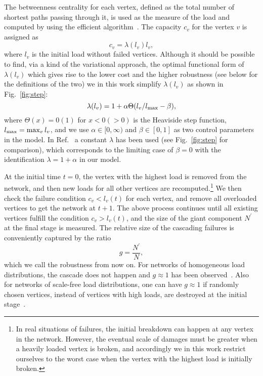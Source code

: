 \documentclass[doublecol]{epl2}
\begin{document}
The betweenness centrality for each vertex, defined as the total
number of shortest paths passing through it, is used as the measure
of the load and computed by using the efficient
algorithm~\cite{Newman}. The capacity $c_v$ for the vertex $v$ is
assigned as
\begin{equation}
\label{eq:c} c_v=\lambda(l_v) l_v ,
\end{equation}
where $l_v$ is the initial load without failed vertices. Although it
should be possible to find, via a kind of the variational approach,
the optimal functional form of $\lambda(l_v)$ which gives rise to
the lower cost and the higher robustness (see below for the
definitions of the two) we in this work simplify $\lambda(l_v)$ as
shown in Fig.~\ref{fig:step}:
\begin{equation}
\label{eq:step} \lambda(l_v) = 1 + \alpha\Theta(l_v/l_{\rm max} -
\beta),
\end{equation}
where $\Theta(x) = 0 (1)$ for $x < 0 (> 0)$ is the Heaviside step
function, $l_{\rm max} = \max_v l_v$, and we use
$\alpha\in{[0,\infty)}$ and $\beta \in [0,1]$ as two control
parameters in the model. In Ref.~\cite{CasModel} a constant
$\lambda$  has been used (see Fig.~\ref{fig:step} for comparison),
which corresponds to the limiting case of $\beta = 0$ with the
identification $\lambda = 1 + \alpha$ in our model.

At the initial time $t=0$, the vertex with the highest load is
removed from the network, and then new loads for all other vertices
are recomputed.\footnote{In real situations of failures,
the initial breakdown can happen at any vertex in the network.
However, the eventual scale of damages must be greater when
a heavily loaded vertex is broken, and accordingly  we in this work
restrict ourselves to the worst case when the vertex with the highest
load is initially broken.}
We then check the failure condition $c_v < l_v(t)$
for each vertex, and remove all overloaded vertices to get the
network at $t+1$. The above process continues until all existing
vertices fulfill the condition $c_v > l_v(t)$, and the size of the
giant component $N^\prime$ at the final stage is measured. The
relative size of the cascading failures is conveniently captured by
the ratio~\cite{CasModel}
\begin{equation}
\label{eq:g} g=\frac{N^\prime}{N} ,
\end{equation}
which we call the robustness from now on. For networks of
homogeneous load distributions, the cascade does not happen and $g
\approx 1$ has been observed~\cite{CasModel}. Also for networks of
scale-free load distributions, one can have $g \approx 1$ if
randomly chosen vertices, instead of vertices with high loads, are
destroyed at the initial stage~\cite{CasModel}.
\end{document}
